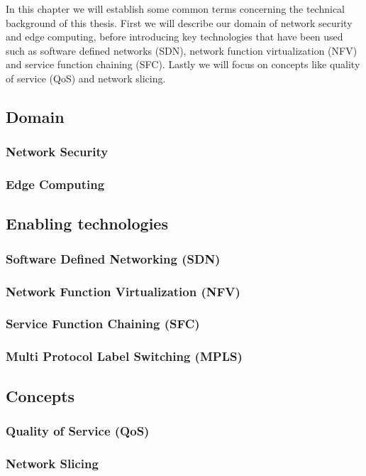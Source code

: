 \documentclass{article}
\begin{document}
\fi
In this chapter we will establish some common terms concerning the technical background of this thesis. First we will describe our domain of network security and edge computing, before introducing key technologies that have been used such as software defined networks (SDN), network function virtualization (NFV) and service function chaining (SFC). Lastly we will focus on concepts like quality of service (QoS) and network slicing.

\subsection{Domain}
\subsubsection{Network Security}
\subsubsection{Edge Computing}

\subsection{Enabling technologies}
\subsubsection{Software Defined Networking (SDN)}
\subsubsection{Network Function Virtualization (NFV)}
\subsubsection{Service Function Chaining (SFC)}
\subsubsection{Multi Protocol Label Switching (MPLS)}

\subsection{Concepts}
\subsubsection{Quality of Service (QoS)}
\subsubsection{Network Slicing}
\end{document}

